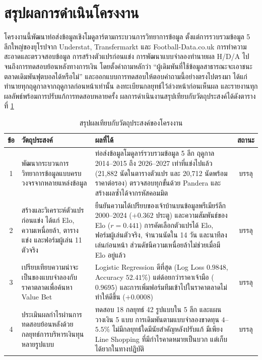 
\section{สรุปผลการดำเนินโครงงาน}

โครงงานนี้พัฒนาท่อส่งข้อมูลเชิงโมดูลาร์ตามกระบวนการวิทยาการข้อมูล ตั้งแต่การรวบรวมข้อมูล 5 ลีกใหญ่ของยุโรปจาก Understat, Transfermarkt และ Football-Data.co.uk การทำความสะอาดและตรวจสอบข้อมูล การสร้างตัวแปรก่อนแข่ง การพัฒนาแบบจำลองทำนายผล H/D/A ไปจนถึงการทดสอบย้อนหลังทางการเงิน โดยตั้งคำถามหลักว่า ``ผู้เดิมพันที่ใช้ข้อมูลสาธารณะจะเอาชนะตลาดเดิมพันฟุตบอลได้หรือไม่'' และออกแบบการทดสอบให้ตอบคำถามนี้อย่างตรงไปตรงมา ได้แก่ ทำนายทุกฤดูกาลจากฤดูกาลก่อนหน้าเท่านั้น ลงทะเบียนกลยุทธ์ไว้ล่วงหน้าก่อนเห็นผล และรายงานทุกผลลัพธ์พร้อมการปรับแก้การทดสอบหลายครั้ง ผลการดำเนินงานสรุปเทียบกับวัตถุประสงค์ได้ดังตารางที่ \ref{tab:obj_result}

\begin{table}[htbp]
\centering
\caption{สรุปผลเทียบกับวัตถุประสงค์ของโครงงาน}
\label{tab:obj_result}
\begin{tabular}{|c|>{\raggedright\arraybackslash}p{4.2cm}|>{\raggedright\arraybackslash}p{6.6cm}|c|}
\hline
\textbf{ข้อ} & \textbf{วัตถุประสงค์} & \textbf{ผลที่ได้} & \textbf{สถานะ} \\
\hline
1 & พัฒนากระบวนการวิทยาการข้อมูลแบบครบวงจรจากหลายแหล่งข้อมูล & ท่อส่งข้อมูลโมดูลาร์รวบรวมข้อมูล 5 ลีก ฤดูกาล 2014--2015 ถึง 2026--2027 เท่าที่แข่งไปแล้ว (21,882 นัดในตารางตัวแปร และ 20,712 นัดพร้อมราคาต่อรอง) ตรวจสอบทุกขั้นด้วย Pandera และสร้างผลซ้ำได้จากรหัสคอมมิต & บรรลุ \\ \hline
2 & สร้างและวิเคราะห์ตัวแปรก่อนแข่ง ได้แก่ Elo, ความเหนื่อยล้า, ตารางแข่ง และฟอร์มผู้เล่น 11 ตัวจริง & ยืนยันความได้เปรียบของเจ้าบ้านบนข้อมูลพรีเมียร์ลีก 2000--2024 ($+0.362$ ประตู) และความสัมพันธ์ของ Elo ($r = 0.441$) การคัดเลือกตัวแปรได้ Elo, ฟอร์มผู้เล่นตัวจริง, จำนวนนัดใน 14 วัน และนาทีลงเล่นก่อนหน้า ส่วนดัชนีความเหนื่อยล้าไม่ช่วยเมื่อมี Elo อยู่แล้ว & บรรลุ \\ \hline
3 & เปรียบเทียบความน่าจะเป็นของแบบจำลองกับราคาตลาดเพื่อค้นหา Value Bet & Logistic Regression ดีที่สุด (Log Loss $0.9848$, Accuracy $52.41\%$) แต่ด้อยกว่าราคาเจ้ามือ ($0.9695$) และการเพิ่มฟอร์มทีมเข้าไปในราคาตลาดไม่ทำให้ดีขึ้น ($+0.0008$) & บรรลุ \\ \hline
4 & ประเมินผลกำไรผ่านการทดสอบย้อนหลังด้วยกลยุทธ์การบริหารเงินทุนหลายรูปแบบ & ทดสอบ 18 กลยุทธ์ 42 รูปแบบใน 5 ลีก และแผนวางเงิน 5 แบบ การเดิมพันตามแบบจำลองขาดทุน $4$--$5.5\%$ ไม่มีกลยุทธ์ใดมีนัยสำคัญหลังปรับแก้ มีเพียง Line Shopping ที่มีกำไรคาดหมายเป็นบวก แต่เก็บได้ยากในทางปฏิบัติ & บรรลุ \\
\hline
\end{tabular}
\end{table}

